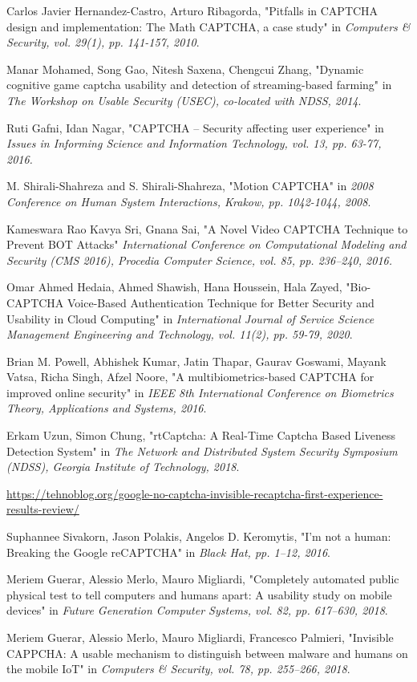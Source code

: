 \begin{thebibliography}{9}
Carlos Javier Hernandez-Castro, Arturo Ribagorda, "Pitfalls in CAPTCHA design and implementation: The Math CAPTCHA, a case study" in \emph{Computers \& Security, vol. 29(1), pp. 141-157, 2010}.

Manar Mohamed, Song Gao, Nitesh Saxena, Chengcui Zhang,  "Dynamic cognitive  game  captcha  usability  and  detection  of  streaming-based  farming" in \emph{The Workshop on Usable Security (USEC), co-located with NDSS, 2014}.

Ruti Gafni, Idan Nagar, "CAPTCHA – Security affecting user experience" in \emph{Issues in Informing Science and Information Technology, vol. 13, pp. 63-77, 2016.}

M. Shirali-Shahreza and S. Shirali-Shahreza, "Motion CAPTCHA" in \emph{2008 Conference on Human System Interactions, Krakow, pp. 1042-1044, 2008}.

Kameswara Rao Kavya Sri, Gnana Sai, "A Novel Video CAPTCHA Technique to Prevent BOT Attacks" \emph{International Conference on Computational Modeling and  Security (CMS 2016), Procedia Computer  Science, vol. 85, pp. 236–240, 2016.}

Omar Ahmed Hedaia, Ahmed Shawish, Hana Houssein, Hala Zayed, "Bio-CAPTCHA Voice-Based Authentication Technique for Better Security and Usability in Cloud Computing" in \emph{International Journal of Service Science Management Engineering and Technology, vol. 11(2), pp. 59-79, 2020}.

Brian M. Powell, Abhishek Kumar, Jatin Thapar, Gaurav Goswami, Mayank Vatsa, Richa Singh, Afzel Noore, "A multibiometrics-based CAPTCHA for improved online security" in \emph{IEEE 8th International Conference on Biometrics Theory, Applications and Systems, 2016}.

Erkam Uzun, Simon Chung, "rtCaptcha: A Real-Time Captcha Based Liveness Detection System" in \emph{The Network and Distributed System Security Symposium (NDSS), Georgia Institute of Technology, 2018}.

\href{https://tehnoblog.org/google-no-captcha-invisible-recaptcha-first-experience-results-review/}{https://tehnoblog.org/google-no-captcha-invisible-recaptcha-first-experience-results-review/}

Suphannee Sivakorn, Jason Polakis, Angelos D. Keromytis, "I'm not a human: Breaking the Google reCAPTCHA" in \emph{Black Hat, pp. 1–12, 2016}.

Meriem Guerar, Alessio Merlo, Mauro Migliardi, "Completely automated public physical test to tell computers and humans apart: A usability study on mobile devices" in \emph{Future Generation Computer Systems, vol. 82, pp. 617–630, 2018}.

Meriem Guerar, Alessio Merlo, Mauro Migliardi, Francesco Palmieri, "Invisible CAPPCHA: A usable mechanism to distinguish between malware and humans on the mobile IoT" in \emph{Computers \& Security, vol. 78, pp. 255–266, 2018}.

\end{thebibliography}
